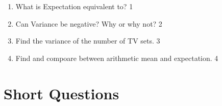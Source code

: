 \documentclass[a4paper,oneside, margin=1.4in]{book}
\begin{document}
\begin{enumerate}
  \begin{enumerate}
    \item
	What is Expectation equivalent to? \hfill 1
    \item
	Can Variance be negative? Why or why not? \hfill 2
    \item  
	Find the variance of the number of TV sets. \hfill 3
    \item
	Find and compoare between arithmetic mean and expectation. \hfill 4
  \end{enumerate}
  \end{enumerate}
  
\section{Short Questions}
\end{document}
